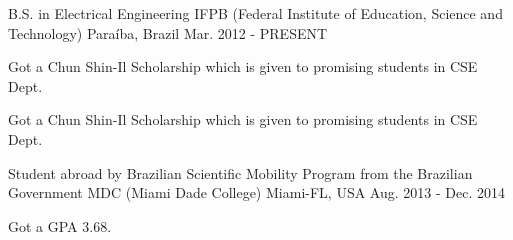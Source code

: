 

\begin{cventries}

  \cventry
    {B.S. in Electrical Engineering} %
    {IFPB (Federal Institute of Education, Science and Technology)} %
    {Paraíba, Brazil} %
    {Mar. 2012 - PRESENT} %
    {
      \begin{cvitems} %
        \item {Got a Chun Shin-Il Scholarship which is given to promising students in CSE Dept.}
        \item {Got a Chun Shin-Il Scholarship which is given to promising students in CSE Dept.}
      \end{cvitems}
    }
    
    \cventry
    {Student abroad by Brazilian Scientific Mobility Program from the Brazilian Government} %
    {MDC (Miami Dade College)} %
    {Miami-FL, USA} %
    {Aug. 2013 - Dec. 2014} %
    {
		\begin{cvitems} %
        \item {Got a GPA 3.68.}  
        \end{cvitems} 
    }

\end{cventries}
